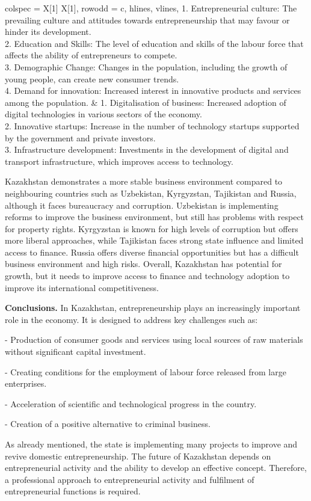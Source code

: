 \begin{longtblr}[
  label = none,
  entry = none,
]{
  colspec = {X[1] X[1]},
  row{odd} = {c},
  hlines,
  vlines,
}
{\small 1. Entrepreneurial culture: The prevailing culture and attitudes towards entrepreneurship that may favour or hinder its development.\\2. Education and Skills: The level of education and skills of the labour force that affects the ability of entrepreneurs to compete.\\3. Demographic Change: Changes in the population, including the growth of young people, can create new consumer trends.\\4. Demand for innovation: Increased interest in innovative products and services among the population.} & {\small 1. Digitalisation of business: Increased adoption of digital technologies in various sectors of the economy.\\2. Innovative startups: Increase in the number of technology startups supported by the government and private investors.\\3. Infrastructure development: Investments in the development of digital and transport infrastructure, which improves access to technology.}                                                                             
\end{longtblr}

\begin{multicols}{2}
Kazakhstan demonstrates a more stable business environment compared to
neighbouring countries such as Uzbekistan, Kyrgyzstan, Tajikistan and
Russia, although it faces bureaucracy and corruption. Uzbekistan is
implementing reforms to improve the business environment, but still has
problems with respect for property rights. Kyrgyzstan is known for high
levels of corruption but offers more liberal approaches, while
Tajikistan faces strong state influence and limited access to finance.
Russia offers diverse financial opportunities but has a difficult
business environment and high risks. Overall, Kazakhstan has potential
for growth, but it needs to improve access to finance and technology
adoption to improve its international competitiveness.

{\bfseries Conclusions.} In Kazakhstan, entrepreneurship plays an
increasingly important role in the economy. It is designed to address
key challenges such as:

- Production of consumer goods and services using local sources of raw
materials without significant capital investment.

- Creating conditions for the employment of labour force released from
large enterprises.

- Acceleration of scientific and technological progress in the country.

- Creation of a positive alternative to criminal business.

As already mentioned, the state is implementing many projects to improve
and revive domestic entrepreneurship. The future of Kazakhstan depends
on entrepreneurial activity and the ability to develop an effective
concept. Therefore, a professional approach to entrepreneurial activity
and fulfilment of entrepreneurial functions is required.
\end{multicols}

